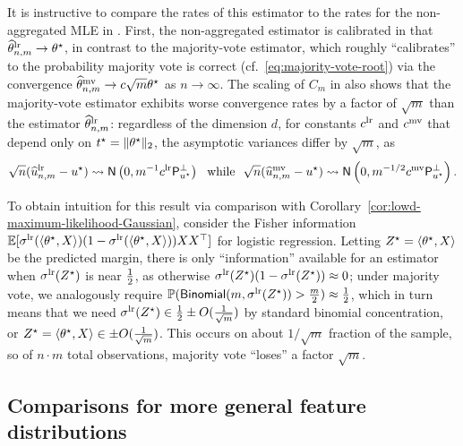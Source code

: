 It is instructive to compare the rates of this estimator to the rates
for the non-aggregated MLE
in . First, the non-aggregated
estimator is calibrated in that $\widehat{\theta}^{\textup{lr}}_{n,m} \to \theta^\star$, in contrast to the
majority-vote estimator, which roughly
``calibrates'' to the probability majority vote is correct
(cf.~\eqref{eq:majority-vote-root}) via the convergence
$\widehat{\theta}^{\textup{mv}}_{n,m} \to c \sqrt{m} \theta^\star$ as $n
\to \infty$.
%
The scaling of $C_m$ in
 also shows that the majority-vote
estimator exhibits worse convergence rates by a factor of $\sqrt{m}$ than
the estimator $\widehat{\theta}^{\textup{lr}}_{n,m}$: regardless of the dimension $d$,
for constants $c^{\textup{lr}}$ and $c^{\textup{mv}}$ 
that depend only on $t^\star = \|{\theta^\star}\|_2$,
the asymptotic variances differ by $\sqrt{m}$, as
\begin{equation*}
  \sqrt{n}(\widehat{u}^{\textup{lr}}_{n,m} - u^\star) \rightsquigarrow
  \mathsf{N}\left(0, m^{-1} c^{\textup{lr}} \mathsf{P}_{u^\star}^\perp  \right)
  ~~ \mbox{while} ~~
  \sqrt{n}(\widehat{u}^{\textup{mv}}_{n,m} - u^\star) \rightsquigarrow
  \mathsf{N}\left(0, m^{-1/2} c^{\textup{mv}} \mathsf{P}_{u^\star}^\perp \right).
\end{equation*}

To obtain intuition for this result via comparison with
Corollary~\ref{cor:lowd-maximum-likelihood-Gaussian}, consider the Fisher
information $\mathbb{E}[\sigma^{\textup{lr}}(\langle\theta^\star, X\rangle) (1 - \sigma^{\textup{lr}}(\langle\theta^\star,
  X\rangle)) XX^\top]$ for logistic regression. Letting $Z^\star = \langle\theta^\star,
X\rangle$ be the predicted margin, there is only ``information'' available for an
estimator when $\sigma^{\textup{lr}}(Z^\star)$ is near $\frac{1}{2}$, as otherwise
$\sigma^{\textup{lr}}(Z^\star)(1 - \sigma^{\textup{lr}}(Z^\star)) \approx 0$; under majority vote, we
analogously require $\mathbb{P}(\mathsf{Binomial}(m, \sigma^{\textup{lr}}(Z^\star)) > \frac{m}{2}) \approx
\frac{1}{2}$, which in turn means that we need $\sigma^{\textup{lr}}(Z^\star) \in \frac{1}{2} \pm
O(\frac{1}{\sqrt{m}})$ by standard binomial concentration, or $Z^\star =
\langle\theta^\star, X\rangle \in \pm O(\frac{1}{\sqrt{m}})$.  This occurs on about
$1/\sqrt{m}$ fraction of the sample, so of $n \cdot m$ total observations,
majority vote ``loses'' a factor $\sqrt{m}$.

\newcommand{\mt}{$\textsc{M}_\beta$}

\subsection{Comparisons for more general feature distributions}
\label{sec:non-gauss}

